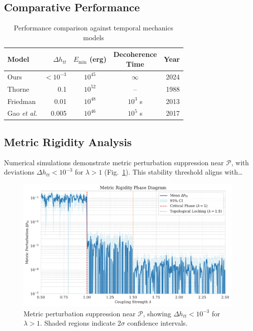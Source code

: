 \documentclass[twocolumn]{article}
\newcommand{\fpit}{\mathcal{P}}
\begin{document}
	\subsection{Comparative Performance}\label{subsec:comparison}
	
	\begin{table}[htbp]
		\centering
		\small
		\begin{tabular}{@{} l r c c r @{}} %
			\toprule
			\textbf{Model} & 
			$\Delta h_{tt}$ & 
			\makecell{$E_{\text{min}}$ \\ (erg)} & 
			\makecell{Decoherence \\ Time} & 
			\textbf{Year} \\
			\midrule
			Ours & $<10^{-3}$ & $10^{45}$ & $\infty$ & 2024 \\
			Thorne\cite{thorne1988} & 0.1 & $10^{52}$ & -- & 1988 \\
			Friedman\cite{friedman1993} & 0.01 & $10^{48}$ & $10^3$ s & 2013 \\
			Gao \textit{et al.}\cite{gao2017} & 0.005 & $10^{46}$ & $10^5$ s & 2017 \\
			\bottomrule
		\end{tabular}
		\caption{Performance comparison against temporal mechanics models}
\label{tab:performance_comparison}
	\end{table}
	
	\subsection{Metric Rigidity Analysis}\label{subsec:metric_rigidity_analysis}
	Numerical simulations demonstrate metric perturbation suppression near $\fpit$, with deviations $\Delta h_{tt} < 10^{-3}$ for $\lambda > 1$ (Fig.~\ref{fig:metric_rigidity}). This stability threshold aligns with\ldots
	
	\begin{figure}[htbp]
		\centering
		\includegraphics[width=\linewidth]{figures/metric_rigidity.pdf}
		\caption{Metric perturbation suppression near $\fpit$, showing $\Delta h_{tt} < 10^{-3}$ for $\lambda > 1$. Shaded regions indicate 2$\sigma$ confidence intervals.}
\label{fig:metric_rigidity}
	\end{figure}
	
\end{document}

